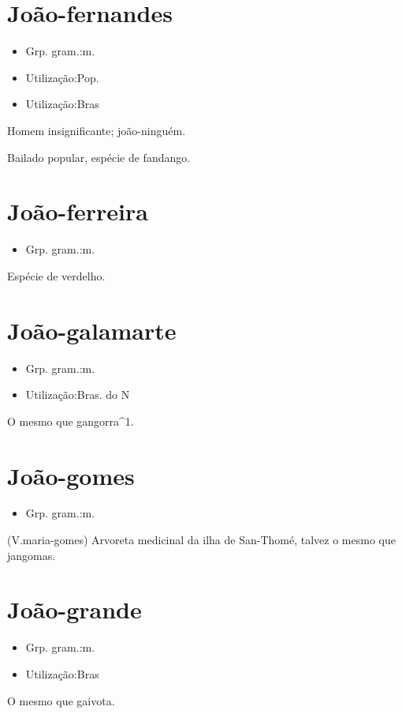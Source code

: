 \documentclass{article}
\begin{document}
\section{João-fernandes}
\begin{itemize}
\item {Grp. gram.:m.}
\end{itemize}
\begin{itemize}
\item {Utilização:Pop.}
\end{itemize}
\begin{itemize}
\item {Utilização:Bras}
\end{itemize}
Homem insignificante; joão-ninguém.

Bailado popular, espécie de fandango.
\section{João-ferreira}
\begin{itemize}
\item {Grp. gram.:m.}
\end{itemize}
Espécie de verdelho.
\section{João-galamarte}
\begin{itemize}
\item {Grp. gram.:m.}
\end{itemize}
\begin{itemize}
\item {Utilização:Bras. do N}
\end{itemize}
O mesmo que \textunderscore gangorra\textunderscore ^1.
\section{João-gomes}
\begin{itemize}
\item {Grp. gram.:m.}
\end{itemize}
(V.maria-gomes)
Arvoreta medicinal da ilha de San-Thomé, talvez o mesmo que \textunderscore jangomas\textunderscore .
\section{João-grande}
\begin{itemize}
\item {Grp. gram.:m.}
\end{itemize}
\begin{itemize}
\item {Utilização:Bras}
\end{itemize}
O mesmo que \textunderscore gaivota\textunderscore .
\end{document}
